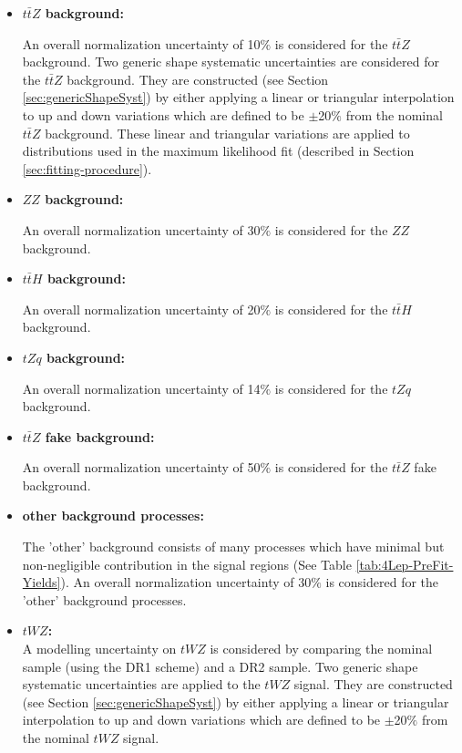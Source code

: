 \begin{itemize}
\item \textbf{$t\bar{t}Z$ background:}

An overall normalization uncertainty of 10$\%$ is considered for the $t\bar{t}Z$ background. Two generic shape systematic uncertainties are considered for the $t\bar{t}Z$ background. They are constructed (see Section \ref{sec:genericShapeSyst}) by either applying a linear or triangular interpolation to up and down variations which are defined to be $\pm$20$\%$ from the nominal $t\bar{t}Z$ background. These linear and triangular variations are applied to distributions used in the maximum likelihood fit (described in Section \ref{sec:fitting-procedure}).

\item \textbf{$ZZ$ background:}

An overall normalization uncertainty of 30$\%$ is considered for the $ZZ$ background.

\item \textbf{$t\bar{t}H$ background:}

An overall normalization uncertainty of 20$\%$ is considered for the $t\bar{t}H$ background.



\item \textbf{$tZq$ background:}

An overall normalization uncertainty of 14$\%$ is considered for the $tZq$ background.


\item \textbf{$t\bar{t}Z$ fake background:}

An overall normalization uncertainty of 50$\%$ is considered for the $t\bar{t}Z$ fake background.


\item \textbf{other background processes:}

The 'other' background consists of many processes which have minimal but non-negligible contribution in the signal regions (See Table \ref{tab:4Lep-PreFit-Yields}). An overall normalization uncertainty of 30$\%$ is considered for the 'other' background processes.


\item \textbf{$tWZ$:}\\
A modelling uncertainty on $tWZ$ is considered by comparing the nominal sample (using the DR1 scheme) and a DR2 sample. Two generic shape systematic uncertainties are applied to the $tWZ$ signal. They are constructed (see Section \ref{sec:genericShapeSyst}) by either applying a linear or triangular interpolation to up and down variations which are defined to be $\pm$20$\%$ from the nominal $tWZ$ signal.

\end{itemize}

